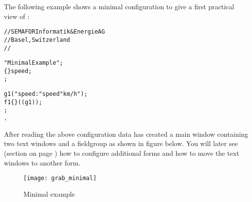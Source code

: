 The following example shows a minimal configuration to give a first
practical view of \INTENS{}:


\begin{boxedminipage}[t]{\linewidth}
\begin{alltt}
// SEMAFOR Informatik & Energie AG
// Basel, Switzerland
//

\DESCRIPTION "Minimal Example";
\DATAPOOL
  \REAL\{\EDITABLE\} speed;
\END \DATAPOOL;

\UIMANAGER
   \FIELDGROUP
      g1( "speed:" speed "km/h" );
   \FORM
      f1\{\MAIN\}( (g1) );
\END \UIMANAGER;
\END.
\end{alltt}
\end{boxedminipage}

\vspace{0.5cm}

After reading the above configuration data
\INTENS{} has created a main window containing two text windows and
a fieldgroup as shown in figure below.
You will later see (section  on page
\pageref{sec:uimanager}) how to configure additional forms and how to
move the text windows to another form. \\
\vspace{0.5cm}

\begin{figure}[h]\label{fig:minimalExample}
  \begin{center}
    \texttt{[image: grab\_minimal]}
  \end{center}
  \caption{Minimal example}
\end{figure}
